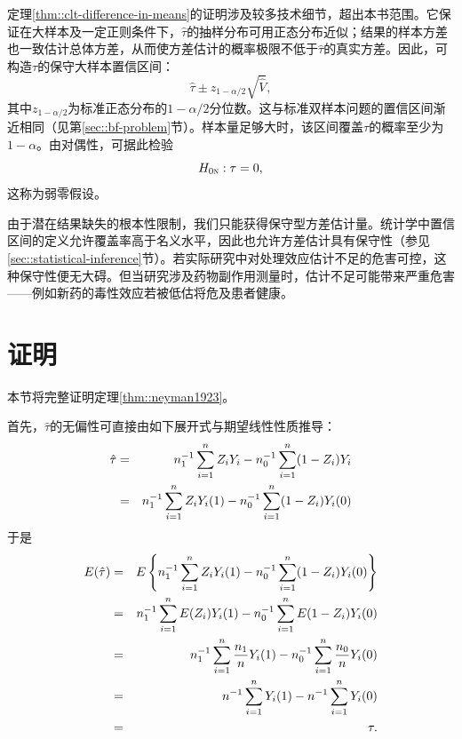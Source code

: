 定理\ref{thm::clt-difference-in-means}的证明涉及较多技术细节，超出本书范围。它保证在大样本及一定正则条件下，$\hat{\tau} $的抽样分布可用正态分布近似；结果的样本方差也一致估计总体方差，从而使\cite{Neyman:1923}方差估计的概率极限不低于$\hat{\tau} $的真实方差。因此，可构造$\tau$的保守大样本置信区间：
$$
\hat{\tau} \pm z_{1-\alpha/2} \sqrt{  \hat{V}  },
$$
其中$z_{1-\alpha/2}$为标准正态分布的$1-\alpha/2$分位数。这与标准双样本问题的置信区间渐近相同（见第\ref{sec::bf-problem}节）。样本量足够大时，该区间覆盖$\tau$的概率至少为$1-\alpha$。由对偶性，可据此检验
$$
H_{0\textsc{n}}: \tau = 0,
$$
这称为弱零假设。 



由于潜在结果缺失的根本性限制，我们只能获得保守型方差估计量。统计学中置信区间的定义允许覆盖率高于名义水平，因此也允许方差估计具有保守性（参见\ref{sec::statistical-inference}节）。若实际研究中对处理效应估计不足的危害可控，这种保守性便无大碍。但当研究涉及药物副作用测量时，估计不足可能带来严重危害——例如新药的毒性效应若被低估将危及患者健康。
 
 

\section{证明}\label{sec::prove-neyman-1923}

本节将完整证明定理\ref{thm::neyman1923}。


首先，$\hat{\tau}$的无偏性可直接由如下展开式与期望线性性质推导：
\begin{eqnarray*}
\hat{\tau} &=& n_1^{-1} \sum_{i=1}^n Z_i Y_i - n_0^{-1} \sum_{i=1}^n (1-Z_i) Y_i \\
&=& n_1^{-1} \sum_{i=1}^n Z_i Y_i(1) - n_0^{-1} \sum_{i=1}^n (1-Z_i) Y_i(0) 
\end{eqnarray*}
于是
\begin{eqnarray*}
E( \hat{\tau}  ) &=& E\left\{    n_1^{-1} \sum_{i=1}^n Z_i Y_i(1) - n_0^{-1} \sum_{i=1}^n (1-Z_i) Y_i(0)   \right\} \\
&=& n_1^{-1} \sum_{i=1}^n E(Z_i) Y_i(1) - n_0^{-1} \sum_{i=1}^n E(1-Z_i) Y_i(0) \\
&=& n_1^{-1} \sum_{i=1}^n \frac{n_1}{n} Y_i(1) - n_0^{-1} \sum_{i=1}^n \frac{n_0}{n} Y_i(0) \\
&=&  n^{-1} \sum_{i=1}^n Y_i(1) - n^{-1} \sum_{i=1}^n Y_i(0) \\
&=& \tau .
\end{eqnarray*}



